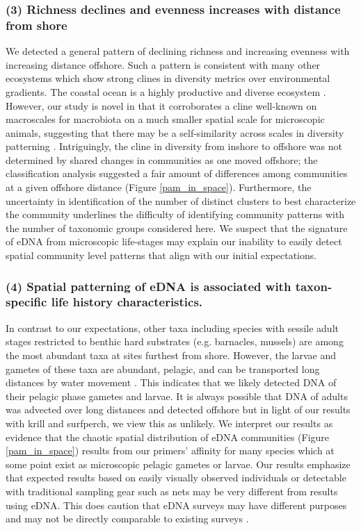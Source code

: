 \documentclass[11pt,letterpaper]{article} %
\begin{document}
 \subsubsection*{(3) Richness declines and evenness increases with distance from shore}
We detected a general pattern of declining richness and increasing evenness with increasing distance offshore. Such a pattern is consistent with many other ecosystems which show strong clines in diversity metrics over environmental gradients. The coastal ocean is a highly productive and diverse ecosystem \citep{Ray1988}. However, our study is novel in that it corroborates a cline well-known on macroscales for macrobiota on a much smaller spatial scale for microscopic animals, suggesting that there may be a self-similarity across scales in diversity patterning \citep{Levin1992}. Intriguingly, the cline in diversity from inshore to offshore was not determined by shared changes in communities as one moved offshore; the classification analysis suggested a fair amount of differences among communities at a given offshore distance (Figure \ref{pam_in_space}). Furthermore, the uncertainty in identification of the number of distinct clusters to best characterize the community underlines the difficulty of identifying community patterns with the number of taxonomic groups considered here. We suspect that the signature of eDNA from microscopic life-stages may explain our inability to easily detect spatial community level patterns that align with our initial expectations.


\subsubsection*{(4) Spatial patterning of eDNA is associated with taxon-specific life history characteristics.}
In contrast to our expectations, other taxa including species with sessile adult stages restricted to benthic hard substrates (e.g. barnacles, mussels) are among the most abundant taxa at sites furthest from shore. However, the larvae and gametes of these taxa are abundant, pelagic, and can be transported long distances by water movement \citep{Strathmann1987}. This indicates that we likely detected DNA of their pelagic phase gametes and larvae. It is always possible that DNA of adults was advected over long distances and detected offshore but in light of our results with krill and surfperch, we view this as unlikely. We interpret our results as evidence that the chaotic spatial distribution of eDNA communities (Figure \ref{pam_in_space}) results from our primers' affinity for many species which at some point exist as microscopic pelagic gametes or larvae. Our results emphasize that expected results based on easily visually observed individuals or detectable with traditional sampling gear such as nets may be very different from results using eDNA. This does caution that eDNA surveys may have different purposes and may not be directly comparable to existing surveys \citep{Shelton2016}.
\end{document}
